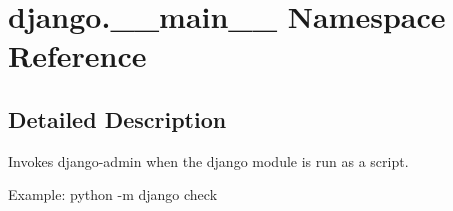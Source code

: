 \hypertarget{namespacedjango_1_1____main____}{}\section{django.\+\_\+\+\_\+main\+\_\+\+\_\+ Namespace Reference}
\label{namespacedjango_1_1____main____}


\subsection{Detailed Description}
\begin{DoxyVerb}Invokes django-admin when the django module is run as a script.

Example: python -m django check
\end{DoxyVerb}
 